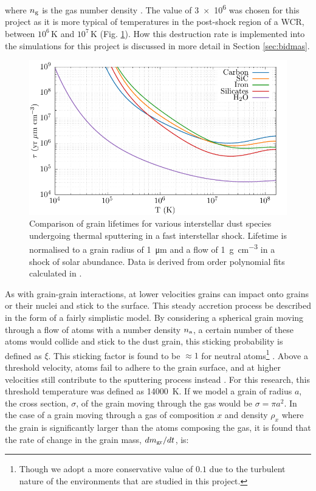 \noindent
where $n_\text{g}$ is the gas number density \parencite{drainePhysicsDustGrains1979,dwekCoolingSputteringInfrared1996}.
The value of \SI{3e6}{\year} was chosen for this project as it is more typical of temperatures in the post-shock region of a WCR, between $10^6\,\si{\kelvin}$ and $10^7\,\si{\kelvin}$ (Fig. \ref{fig:grain-lifespan}).
How this destruction rate is implemented into the simulations for this project is discussed in more detail in Section \ref{sec:bidmas}.

\begin{figure}[h]
  \centering
  \includegraphics{assets/tielens-sputtering/sputter.pdf}
  \caption[Grain lifetime comparison]{Comparison of grain lifetimes for various interstellar dust species undergoing thermal sputtering in a fast interstellar shock. Lifetime is normalised to a grain radius of \SI{1}{\micro\metre} and a flow of \SI{1}{\gram\per\centi\metre\cubed} in a shock of solar abundance. Data is derived from  order polynomial fits calculated in \textcite[Table~4]{tielens_physics_1994}.}
  \label{fig:grain-lifespan}
\end{figure}

As with grain-grain interactions, at lower velocities grains can impact onto grains or their nuclei and stick to the surface.
This steady accretion process be described in the form of a fairly simplistic model.
By considering a spherical grain moving through a flow of atoms with a number density $n_\text{a}$, a certain number of these atoms would collide and stick to the dust grain, this sticking probability is defined as $\xi$.
This sticking factor is found to be $\approx 1$ for neutral atoms\footnote{Though we adopt a more conservative value of $0.1$ due to the turbulent nature of the environments that are studied in this project.} \parencite{watsonAbundancesInterstellarMolecules1972}.
Above a threshold velocity, atoms fail to adhere to the grain surface, and at higher velocities still contribute to the sputtering process instead \parencite{spitzerPhysicalProcessesInterstellar2008}.
For this research, this threshold temperature was defined as \SI{14000}{\kelvin}.
If we model a grain of radius $a$, the cross section, $\sigma$, of the grain moving through the gas would be $\sigma = \pi a^2$.
In the case of a grain moving through a gas of composition $x$ and density $\rho_x$ where the grain is significantly larger than the atoms composing the gas, it is found that the rate of change in the grain mass, $dm_\text{gr}/dt$, is:

